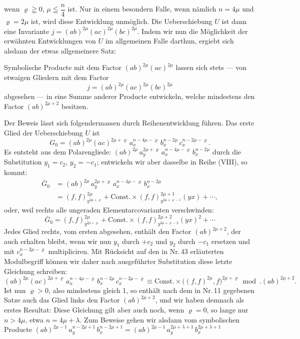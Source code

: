 wenn $\varrho \geqq 0$, $\mu \leqq \dfrac{n}{4}$ ist. Nur in einem besondern Falle, wenn
nämlich $n = 4\mu$ und $\varrho = 2\mu$ ist, wird diese Entwicklung unmöglich. Die
Ueberschiebung $U$ ist dann eine Invariante $j = (ab)^{2\mu}(ac)^{2\mu}(bc)^{2\mu}$.
Indem wir nun die Möglichkeit der erwähnten Entwicklungen von $U$
im allgemeinen Falle darthun, ergiebt sich alsdann der etwas allgemeinere
Satz:

\glqq Symbolische Producte mit dem Factor $(ab)^{2\mu}(ac)^{2\mu}$ lassen
sich stets — von etwaigen Gliedern mit dem Factor
\[
j = (ab)^{2\mu}(ac)^{2\mu}(bc)^{2\mu}
\]
abgesehen — in eine Summe anderer Producte entwickeln,
welche mindestens den Factor $(ab)^{2\mu+2}$ besitzen.\grqq{}

Der Beweis lässt sich folgendermassen durch Reihenentwicklung
führen. Das erste Glied der Ueberschiebung $U$ ist
\[
G_0 = (ab)^{2\mu}(ac)^{2\mu+\varrho}\,a_x^{n-4\mu-\varrho}\,b_x^{n-2\mu}\,c_x^{n-2\mu-\varrho}.
\]
Es entsteht aus dem Polarengliede: $(ab)^{2\mu}\,a_y^{2\mu+\varrho}\,a_x^{n-4\mu-\varrho}\,b_x^{n-2\mu}$
durch die Substitution $y_1 = c_2$, $y_2 = -c_1$; entwickeln wir aber
dasselbe in Reihe (VIII), so kommt:
\[
\begin{aligned}
\bar G_0 &= (ab)^{2\mu}\,a_y^{2\mu+\varrho}\,a_x^{n-4\mu-\varrho}\,b_x^{n-2\mu} \\
&= (f,f)^{2\mu}_{y^{2\mu+\varrho}} + \text{Const.}\times (f,f)^{2\mu+1}_{y^{2\mu+\varrho-1}}(yx) + \cdots,
\end{aligned}
\]
oder, weil rechts alle ungeraden Elementarcovarianten verschwinden:
\[
\bar G_0 = (f,f)^{2\mu}_{y^{2\mu+\varrho}} + \text{Const.}\times (f,f)^{2\mu+2}_{y^{2\mu+\varrho-2}}(yx)^2 + \cdots
\]
Jedes Glied rechts, vom ersten abgesehen, enthält den Factor
$(ab)^{2\mu+2}$, der auch erhalten bleibt, wenn wir nun $y_1$ durch $+c_2$ und
$y_2$ durch $-c_1$ ersetzen und mit $c_x^{n-2\mu-\varrho}$ multipliciren. Mit Rücksicht
auf den in Nr.\,43 erläuterten Modulbegriff können wir daher nach
ausgeführter Substitution diese letzte Gleichung schreiben:
\[
(ab)^{2\mu}(ac)^{2\mu+\varrho}\,a_x^{n-4\mu-\varrho}\,b_x^{n-2\mu}\,c_x^{n-2\mu-\varrho}
\equiv \text{Const.}\times \big((f,f)^{2\mu}, f\big)^{2\mu+\varrho} \bmod. (ab)^{2\mu+2}.
\]
Ist nun $\varrho > 0$, also mindestens gleich 1, so enthält nach dem in
Nr.\,11 gegebenen Satze auch das Glied links den Factor $(ab)^{2\mu+2}$, und
wir haben demnach als erstes Resultat:
Diese Gleichung gilt aber auch noch, wenn $\varrho = 0$, so lange nur
$n > 4\mu$, etwa $n = 4\mu + \lambda$. Zum Beweise gehen wir alsdann vom
symbolischen Producte $(ab)^{2\mu-1}\,a_y^{n-2\mu+1}\,b_x^{n-2\mu+1} = (ab)^{2\mu-1}\,a_y^{2\mu+\lambda+1}\,b_x^{2\mu+\lambda+1}$


